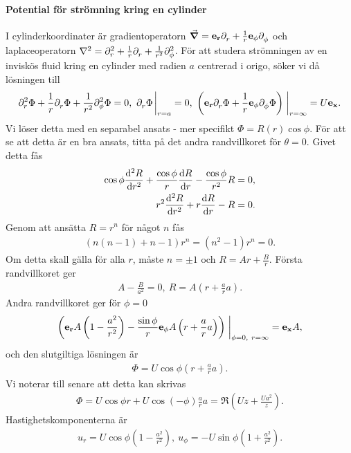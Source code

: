 \paragraph{Potential för strömning kring en cylinder}
I cylinderkoordinater är gradientoperatorn $\grad = \ub{r}\del{r} + \frac{1}{r}\ub{\phi}\del{\phi}$ och laplaceoperatorn $\laplacian = \del[2]{r} + \frac{1}{r}\del{r} + \frac{1}{r^{2}}\del[2]{\phi}$. För att studera strömningen av en inviskös fluid kring en cylinder med radien $a$ centrerad i origo, söker vi då lösningen till
\begin{align*}
	\del[2]{r}{\Phi} + \frac{1}{r}\del{r}{\Phi} + \frac{1}{r^{2}}\del[2]{\phi}{\Phi} = 0,\ \del{r}{\Phi}\eval_{r = a} = 0,\ \left(\ub{r}\del{r}{\Phi} + \frac{1}{r}\ub{\phi}\del{\phi}{\Phi}\right)\eval_{r = \infty} = U\ub{x}.
\end{align*}
Vi löser detta med en separabel ansats - mer specifikt $\Phi = R(r)\cos{\phi}$. För att se att detta är en bra ansats, titta på det andra randvillkoret för $\theta = 0$. Givet detta fås
\begin{align*}
	\cos{\phi}\dv[2]{R}{r} + \frac{\cos{\phi}}{r}\dv{R}{r} - \frac{\cos{\phi}}{r^{2}}R &= 0, \\
	r^{2}\dv[2]{R}{r} + r\dv{R}{r} - R                                                 &= 0.
\end{align*}
Genom att ansätta $R = r^{n}$ för något $n$ fås
\begin{align*}
	(n(n - 1) + n - 1)r^{n} = (n^{2} - 1)r^{n} = 0.
\end{align*}
Om detta skall gälla för alla $r$, måste $n = \pm 1$ och $R = Ar + \frac{B}{r}$. Första randvillkoret ger
\begin{align*}
	A - \frac{B}{a^{2}} = 0,\ R = A\left(r + \frac{a}{r}a\right).
\end{align*}
Andra randvillkoret ger för $\phi = 0$
\begin{align*}
	\left(\ub{r}A\left(1 - \frac{a^{2}}{r^{2}}\right) - \frac{\sin{\phi}}{r}\ub{\phi}A\left(r + \frac{a}{r}a\right)\right)\eval_{\phi = 0,\ r = \infty} = \ub{x}A,
\end{align*}
och den slutgiltiga lösningen är
\begin{align*}
	\Phi = U\cos{\phi}\left(r + \frac{a}{r}a\right).
\end{align*}
Vi noterar till senare att detta kan skrivas
\begin{align*}
	\Phi = U\cos{\phi}r + U\cos(-\phi)\frac{a}{r}a = \Re\left(Uz + \frac{Ua^{2}}{z}\right).
\end{align*}
Hastighetskomponenterna är
\begin{align*}
	u_{r} = U\cos{\phi}\left(1 - \frac{a^{2}}{r^{2}}\right),\ u_{\phi} = -U\sin{\phi}\left(1 + \frac{a^{2}}{r^{2}}\right).
\end{align*}


